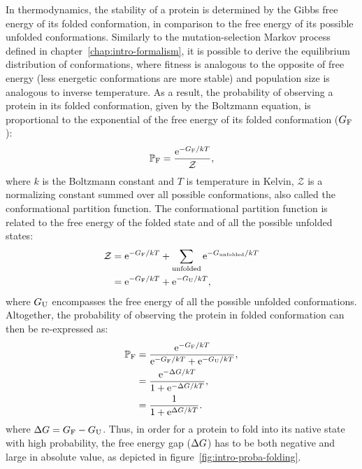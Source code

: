 In thermodynamics, the stability of a protein is determined by the Gibbs free energy of its folded conformation, in comparison to the free energy of its possible unfolded conformations.
Similarly to the mutation-selection Markov process defined in chapter~\ref{chap:intro-formalism}, it is possible to derive the equilibrium distribution of conformations, where fitness is analogous to the opposite of free energy (less energetic conformations are more stable) and population size is analogous to inverse temperature.
As a result, the probability of observing a protein in its folded conformation, given by the Boltzmann equation, is proportional to the exponential of the free energy of its folded conformation ($G_{\text{F}}$):
\begin{equation}
    \mathbb{P}_{\text{F}} = \frac{\text{e}^{-G_{\text{F}} / kT}}{\mathcal{Z}},
\end{equation}
where $k$ is the Boltzmann constant and $T$ is temperature in Kelvin, $\mathcal{Z}$ is a normalizing constant summed over all possible conformations, also called the conformational {partition function}.
The conformational partition function is related to the free energy of the folded state and of all the possible unfolded states:
\begin{align}
    \mathcal{Z} & = \text{e}^{-G_{\text{F}} / kT} + \sum\limits_{\text{unfolded}} \text{e}^{-G_{\text{unfolded}} / kT} \\
    & = \text{e}^{-G_{\text{F}} / kT} + \text{e}^{-G_{\text{U}} / kT},
\end{align}
where $G_{\text{U}}$ encompasses the free energy of all the possible unfolded conformations.
Altogether, the probability of observing the protein in folded conformation can then be re-expressed as:
\begin{align}
    \mathbb{P}_{\text{F}} & = \frac{\text{e}^{-G_{\text{F}} / kT}}{\text{e}^{-G_{\text{F}} / kT} + \text{e}^{-G_{\text{U}} / kT}}, \\
    & = \frac{\text{e}^{-\Delta G/kT}}{ 1 + \text{e}^{-\Delta G/kT} }, \\
    & = \frac{1}{ 1 + \text{e}^{\Delta G/kT} }.
\end{align}
where $\Delta G = G_{\text{F}} - G_{\text{U}}$.
Thus, in order for a protein to fold into its native state with high probability, the free energy gap ($\Delta G$) has to be both negative and large in absolute value, as depicted in figure~\ref{fig:intro-proba-folding}.

